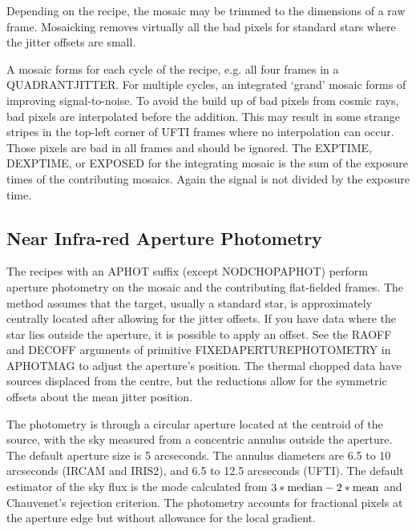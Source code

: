 \documentclass[twoside,11pt]{article}
\newcommand{\htmlref}[2]{#1}
\newcommand{\xlabel}[1]{}
\renewcommand{\_}{\texttt{\symbol{95}}}
\begin{document}
Depending on the recipe, the mosaic may be trimmed to the dimensions
of a raw frame.  Mosaicking removes virtually all the bad pixels for
standard stars where the jitter offsets are small.

A mosaic forms for each cycle of the recipe, e.g. all four frames in a
\htmlref{QUADRANT\_JITTER}{QUADRANT\_JITTER}.  For multiple cycles, an
integrated `grand' mosaic forms of improving signal-to-noise.  To
avoid the build up of bad pixels from cosmic rays, bad pixels are
interpolated before the addition.  This may result in some strange
stripes in the top-left corner of UFTI frames where no interpolation
can occur.  Those pixels are bad in all frames and should be ignored.
The EXP\_TIME, DEXPTIME, or EXPOSED for the integrating mosaic is the sum of the
exposure times of the contributing mosaics.  Again the signal is not
divided by the exposure time.

\subsection{\xlabel{near_infra-red_aperture_photometry}Near Infra-red Aperture
Photometry\label{near_infra-red_aperture_photometry}}

The recipes with an \_APHOT suffix (except
\htmlref{NOD\_CHOP\_APHOT}{NOD\_CHOP\_APHOT}) perform aperture
photometry on the mosaic and the contributing flat-fielded frames.
The method assumes that the target, usually a standard star, is
approximately centrally located after allowing for the jitter offsets.
If you have data where the star lies outside the aperture, it is
possible to apply an offset.  See the RAOFF and DECOFF arguments of
primitive \_FIXED\_APERTURE\_PHOTOMETRY\_ in \_APHOT\_MAG\_ to adjust
the aperture's position.  The thermal
\htmlref{chopped}{chopping} data have sources displaced from the centre, but
the reductions allow for the symmetric offsets about the mean jitter
position.

The photometry is through a circular aperture located at the centroid
of the source, with the sky measured from a concentric annulus outside
the aperture.  The default aperture size is 5 arcseconds.  The annulus
diameters are 6.5 to 10 arcseconds (IRCAM and IRIS2), and 6.5 to 12.5 arcseconds
(UFTI).  The default estimator of the sky flux is the mode calculated
from $3*{\rm median}-2*{\rm mean}$ and Chauvenet's rejection
criterion.  The photometry accounts for fractional pixels at the
aperture edge but without allowance for the local gradient.
\end{document}
